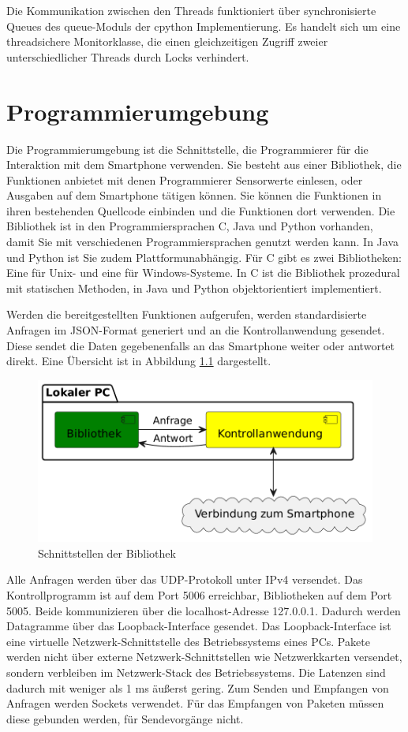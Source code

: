 \documentclass[11pt,a4paper]{report}
\begin{document}
Die Kommunikation zwischen den Threads funktioniert über synchronisierte Queues des queue-Moduls\cite{python_queue} der cpython Implementierung.
Es handelt sich um eine threadsichere Monitorklasse, die einen gleichzeitigen Zugriff zweier unterschiedlicher Threads durch Locks verhindert.

\chapter{Programmierumgebung}\label{chap:libs}
Die Programmierumgebung ist die Schnittstelle, die Programmierer für die Interaktion mit dem Smartphone verwenden.
Sie besteht aus einer Bibliothek, die Funktionen anbietet mit denen Programmierer Sensorwerte einlesen, oder Ausgaben auf dem Smartphone tätigen können.
Sie können die Funktionen in ihren bestehenden Quellcode einbinden und die Funktionen dort verwenden.
Die Bibliothek ist in den Programmiersprachen C, Java und Python vorhanden, damit Sie mit verschiedenen Programmiersprachen genutzt werden kann.
In Java und Python ist Sie zudem Plattformunabhängig.
Für C gibt es zwei Bibliotheken: Eine für Unix- und eine für Windows-Systeme.
In C ist die Bibliothek prozedural mit statischen Methoden, in Java und Python objektorientiert implementiert.

Werden die bereitgestellten Funktionen aufgerufen, werden standardisierte Anfragen im JSON-Format generiert und an die Kontrollanwendung gesendet.
Diese sendet die Daten gegebenenfalls an das Smartphone weiter oder antwortet direkt.
Eine Übersicht ist in Abbildung \ref{fig:Schnittstelle Bibliothek} dargestellt.
\begin{figure}[htbp]
  \centering
  \includegraphics[width=.8\textwidth]{images/lib_server_connection}
  \caption{Schnittstellen der Bibliothek}
  \label{fig:Schnittstelle Bibliothek}
\end{figure}

Alle Anfragen werden über das UDP-Protokoll unter IPv4 versendet.
Das Kontrollprogramm ist auf dem Port 5006 erreichbar, Bibliotheken auf dem Port 5005.
Beide kommunizieren über die localhost-Adresse 127.0.0.1.
Dadurch werden Datagramme über das Loopback-Interface gesendet.
Das Loopback-Interface ist eine virtuelle Netzwerk-Schnittstelle des Betriebssystems eines PCs.
Pakete werden nicht über externe Netzwerk-Schnittstellen wie Netzwerkkarten versendet, sondern verbleiben im Netzwerk-Stack des Betriebssystems.
Die Latenzen sind dadurch mit weniger als 1 ms äußerst gering.
Zum Senden und Empfangen von Anfragen werden Sockets verwendet.
Für das Empfangen von Paketen müssen diese gebunden werden, für Sendevorgänge nicht.
\end{document}
